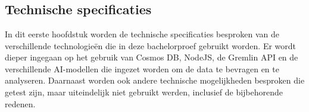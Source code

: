 \chapter{}%
\label{ch:stand-van-zaken}





\section{Technische specificaties}
In dit eerste hoofdstuk worden de technische specificaties besproken van de verschillende technologieën die in deze bachelorproef gebruikt worden.
Er wordt dieper ingegaan op het gebruik van Cosmos DB, NodeJS, de Gremlin API en de verschillende AI-modellen die ingezet worden om de data te bevragen en te analyseren.
Daarnaast worden ook andere technische mogelijkheden besproken die getest zijn, maar uiteindelijk niet gebruikt werden, inclusief de bijbehorende redenen.

